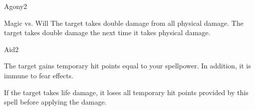 \begin{spellsection}{Agony}{2}
    \begin{spellheader}
    \end{spellheader}
    \begin{spellcontent}
        \begin{spelltargetinginfo}
        \end{spelltargetinginfo}
        \begin{spelleffects}
            \begin{spellattack}{Magic vs. Will}
                \spellsuccess The target takes double damage from all physical damage.
                \spellfailure The target takes double damage the next time it takes physical damage.
            \end{spellattack}
            \spelldur \durshort
        \end{spelleffects}
    \end{spellcontent}
    \begin{spellfooter}
        \miscastrandom
    \end{spellfooter}
\end{spellsection}

\begin{spellsection}{Aid}{2}
    \begin{spellheader}
    \end{spellheader}
    \begin{spellcontent}
        \begin{spelltargetinginfo}
        \end{spelltargetinginfo}
        \begin{spelleffects}
            \spelleffect The target gains temporary hit points equal to your spellpower. In addition, it is immune to fear effects.
            \spelldur \durpersonallong
        \end{spelleffects}
    \end{spellcontent}
    \begin{spellfooter}
        \spellnotes If the target takes life damage, it loses all temporary hit points provided by this spell before applying the damage.
        \miscastexplode
    \end{spellfooter}
\end{spellsection}

